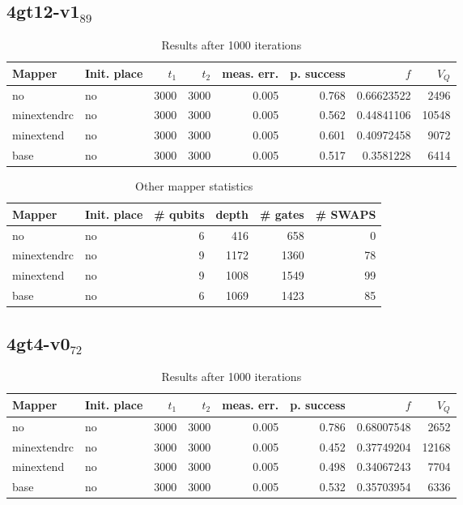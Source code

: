 \documentclass[11pt]{article}
\begin{document}
\subsection{4gt12-v1\(_{\text{89}}\)}
\label{sec:org35987e7}

\begin{table}[!htpb]
\caption{\label{tab:org5e81423}
Results after 1000 iterations}
\centering
\begin{tabular}{llrrrrrr}
\hline
Mapper & Init. place & \(t_1\) & \(t_2\) & meas. err. & p. success & \(f\) & \(V_Q\)\\
\hline
no & no & 3000 & 3000 & 0.005 & 0.768 & 0.66623522 & 2496\\
\hline
minextendrc & no & 3000 & 3000 & 0.005 & 0.562 & 0.44841106 & 10548\\
minextend & no & 3000 & 3000 & 0.005 & 0.601 & 0.40972458 & 9072\\
base & no & 3000 & 3000 & 0.005 & 0.517 & 0.3581228 & 6414\\
\hline
\end{tabular}
\end{table}

\begin{table}[!htpb]
\caption{\label{tab:orgee37c07}
Other mapper statistics}
\centering
\small
\begin{tabular}{llrrrr}
\hline
Mapper & Init. place & \# qubits & depth & \# gates & \# SWAPS\\
\hline
no & no & 6 & 416 & 658 & 0\\
\hline
minextendrc & no & 9 & 1172 & 1360 & 78\\
minextend & no & 9 & 1008 & 1549 & 99\\
base & no & 6 & 1069 & 1423 & 85\\
\hline
\end{tabular}
\end{table}

\subsection{4gt4-v0\(_{\text{72}}\)}
\label{sec:orgcafbc43}

\begin{table}[!htpb]
\caption{\label{tab:orgaf8f6fc}
Results after 1000 iterations}
\centering
\begin{tabular}{llrrrrrr}
\hline
Mapper & Init. place & \(t_1\) & \(t_2\) & meas. err. & p. success & \(f\) & \(V_Q\)\\
\hline
no & no & 3000 & 3000 & 0.005 & 0.786 & 0.68007548 & 2652\\
\hline
minextendrc & no & 3000 & 3000 & 0.005 & 0.452 & 0.37749204 & 12168\\
minextend & no & 3000 & 3000 & 0.005 & 0.498 & 0.34067243 & 7704\\
base & no & 3000 & 3000 & 0.005 & 0.532 & 0.35703954 & 6336\\
\hline
\end{tabular}
\end{table}
\end{document}
